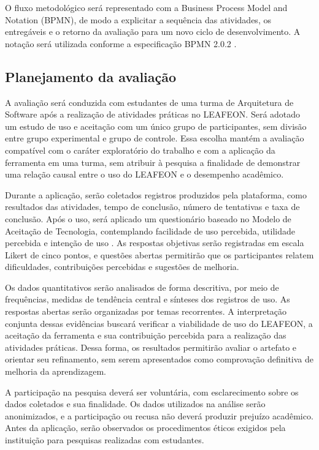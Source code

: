 O fluxo metodológico será representado com a Business Process Model and
Notation (BPMN), de modo a explicitar a sequência das atividades, os entregáveis
e o retorno da avaliação para um novo ciclo de desenvolvimento. A notação será
utilizada conforme a especificação BPMN 2.0.2 \cite{omg_bpmn_2014}.

\subsection{Planejamento da avaliação}

A avaliação será conduzida com estudantes de uma turma de Arquitetura de
Software após a realização de atividades práticas no LEAFEON. Será adotado um
estudo de uso e aceitação com um único grupo de participantes, sem divisão entre
grupo experimental e grupo de controle. Essa escolha mantém a avaliação
compatível com o caráter exploratório do trabalho e com a aplicação da
ferramenta em uma turma, sem atribuir à pesquisa a finalidade de demonstrar uma
relação causal entre o uso do LEAFEON e o desempenho acadêmico.

Durante a aplicação, serão coletados registros produzidos pela plataforma,
como resultados das atividades, tempo de conclusão, número de tentativas e taxa
de conclusão. Após o uso, será aplicado um questionário baseado no Modelo de
Aceitação de Tecnologia, contemplando facilidade de uso percebida, utilidade
percebida e intenção de uso \cite{davis_perceived_1989}. As respostas objetivas
serão registradas em escala Likert de cinco pontos, e questões abertas permitirão
que os participantes relatem dificuldades, contribuições percebidas e sugestões
de melhoria.

Os dados quantitativos serão analisados de forma descritiva, por meio de
frequências, medidas de tendência central e sínteses dos registros de uso. As
respostas abertas serão organizadas por temas recorrentes. A interpretação
conjunta dessas evidências buscará verificar a viabilidade de uso do LEAFEON, a
aceitação da ferramenta e sua contribuição percebida para a realização das
atividades práticas. Dessa forma, os resultados permitirão avaliar o artefato e
orientar seu refinamento, sem serem apresentados como comprovação definitiva de
melhoria da aprendizagem.

A participação na pesquisa deverá ser voluntária, com esclarecimento sobre os
dados coletados e sua finalidade. Os dados utilizados na análise serão
anonimizados, e a participação ou recusa não deverá produzir prejuízo acadêmico.
Antes da aplicação, serão observados os procedimentos éticos exigidos pela
instituição para pesquisas realizadas com estudantes.
